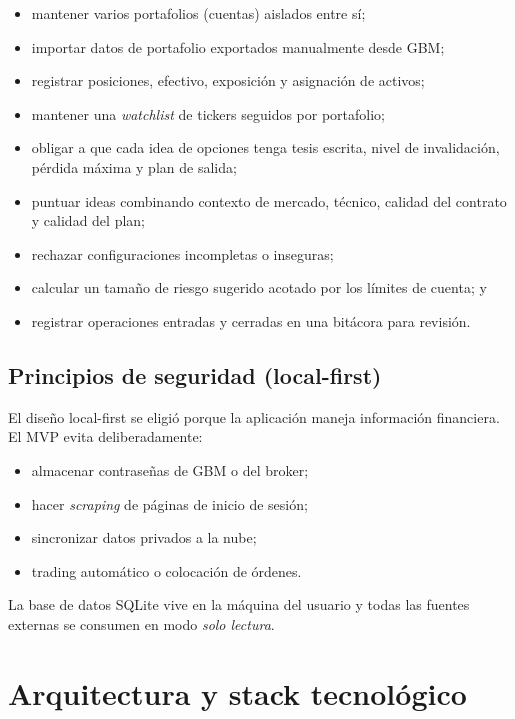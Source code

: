 \documentclass[11pt,letterpaper]{article}
\begin{document}
\begin{itemize}[noitemsep]
  \item mantener varios portafolios (cuentas) aislados entre sí;
  \item importar datos de portafolio exportados manualmente desde GBM;
  \item registrar posiciones, efectivo, exposición y asignación de activos;
  \item mantener una \emph{watchlist} de tickers seguidos por portafolio;
  \item obligar a que cada idea de opciones tenga tesis escrita, nivel de
        invalidación, pérdida máxima y plan de salida;
  \item puntuar ideas combinando contexto de mercado, técnico, calidad del
        contrato y calidad del plan;
  \item rechazar configuraciones incompletas o inseguras;
  \item calcular un tamaño de riesgo sugerido acotado por los límites de cuenta; y
  \item registrar operaciones entradas y cerradas en una bitácora para revisión.
\end{itemize}

\subsection{Principios de seguridad (local-first)}

El diseño local-first se eligió porque la aplicación maneja información
financiera. El MVP evita deliberadamente:

\begin{itemize}[noitemsep]
  \item almacenar contraseñas de GBM o del broker;
  \item hacer \emph{scraping} de páginas de inicio de sesión;
  \item sincronizar datos privados a la nube;
  \item trading automático o colocación de órdenes.
\end{itemize}

La base de datos SQLite vive en la máquina del usuario y todas las fuentes
externas se consumen en modo \emph{solo lectura}.

\section{Arquitectura y stack tecnológico}
\end{document}
